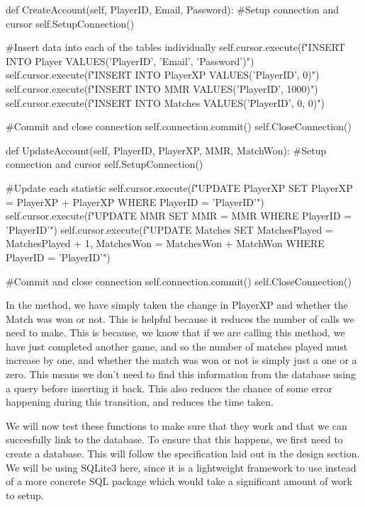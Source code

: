 \vs
\begin{mpy}
    def CreateAccount(self, PlayerID, Email, Password):
        #Setup connection and cursor
        self.SetupConnection()

        #Insert data into each of the tables individually
        self.cursor.execute(f"INSERT INTO Player VALUES('{PlayerID}', '{Email}', '{Password}')")
        self.cursor.execute(f"INSERT INTO PlayerXP VALUES('{PlayerID}', 0)")
        self.cursor.execute(f"INSERT INTO MMR VALUES('{PlayerID}', 1000)")
        self.cursor.execute(f"INSERT INTO Matches VALUES('{PlayerID}', 0, 0)")

        #Commit and close connection
        self.connection.commit()
        self.CloseConnection()

    def UpdateAccount(self, PlayerID, PlayerXP, MMR, MatchWon):
        #Setup connection and cursor
        self.SetupConnection()

        #Update each statistic
        self.cursor.execute(f"UPDATE PlayerXP SET PlayerXP = PlayerXP + {PlayerXP} WHERE PlayerID = '{PlayerID}'")
        self.cursor.execute(f"UPDATE MMR SET MMR = {MMR} WHERE PlayerID = '{PlayerID}'")
        self.cursor.execute(f"UPDATE Matches SET MatchesPlayed = MatchesPlayed + 1, MatchesWon = MatchesWon + {MatchWon} WHERE PlayerID = '{PlayerID}'")

        #Commit and close connection
        self.connection.commit()
        self.CloseConnection()

\end{mpy}
\vs
In the  method, we have simply taken the change in PlayerXP and whether the Match was won or not. This is helpful because it reduces the number of calls we need to make. This is because, we know that if we are calling this method, we have just completed another game, and so the number of matches played must increase by one, and whether the match was won or not is simply just a one or a zero. This means we don't need to find this information from the database using a query before inserting it back. This also reduces the chance of some error happening during this transition, and reduces the time taken.
\vs

We will now test these functions to make sure that they work and that we can succesfully link to the database. To ensure that this happens, we first need to create a database. This will follow the specification laid out in the design section. We will be using SQLite3 here, since it is a lightweight framework to use instead of a more concrete SQL package which would take a significant amount of work to setup.

